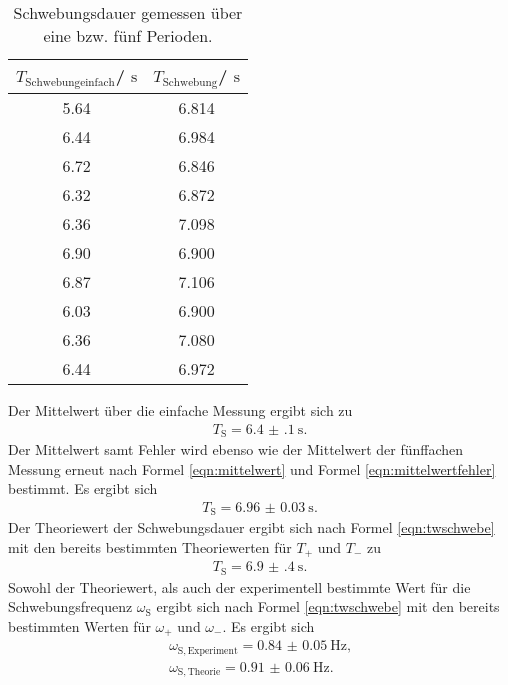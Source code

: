 \begin{table}
	\centering
	\caption{Schwebungsdauer gemessen über eine bzw. fünf Perioden.}
	\label{tab:schwebung}
	\begin{tabular}{cc}
		\toprule
		$T_{\mathrm{Schwebung einfach}}$/ $\si{\second}$ & $T_{\mathrm{Schwebung}}$/ $\si{\second}$ \\
		\midrule
		5.64                                             & 6.814                                    \\
		6.44                                             & 6.984                                    \\
		6.72                                             & 6.846                                    \\
		6.32                                             & 6.872                                    \\
		6.36                                             & 7.098                                    \\
		6.90                                             & 6.900                                    \\
		6.87                                             & 7.106                                    \\
		6.03                                             & 6.900                                    \\
		6.36                                             & 7.080                                    \\
		6.44                                             & 6.972                                    \\
		\bottomrule
	\end{tabular}
\end{table}
Der Mittelwert über die einfache Messung ergibt sich zu
\begin{align*}
	T_{\mathrm{S}}=\SI{6.4(1)}{\second} \text{.}
\end{align*}
Der Mittelwert samt Fehler wird ebenso wie der Mittelwert der fünffachen Messung erneut nach Formel \eqref{eqn:mittelwert} und Formel \eqref{eqn:mittelwertfehler} bestimmt.
Es ergibt sich
\begin{align*}
	T_{\mathrm{S}}=\SI{6.96(3)}{\second}\text{.}
\end{align*}
Der Theoriewert der Schwebungsdauer ergibt sich nach Formel \eqref{eqn:twschwebe} mit den bereits bestimmten Theoriewerten für $T_{\mathrm{+}}$ und $T_{\mathrm{-}}$ zu
\begin{align*}
	T_{\mathrm{S}}=\SI{6.9(4)}{\second}\text{.}
\end{align*}
Sowohl der Theoriewert, als auch der experimentell bestimmte Wert für die Schwebungsfrequenz $\omega_{\mathrm{S}}$ ergibt sich nach Formel \eqref{eqn:twschwebe} mit den bereits bestimmten Werten für $\omega_{\mathrm{+}}$ und $\omega_{\mathrm{-}}$.
Es ergibt sich
\begin{align*}
	\omega_{\mathrm{S,Experiment}}=\SI{0.84(5)}{\Hz}\text{,} \\
	\omega_{\mathrm{S,Theorie}}=\SI{0.91(6)}{\Hz}\text{.}
\end{align*}
